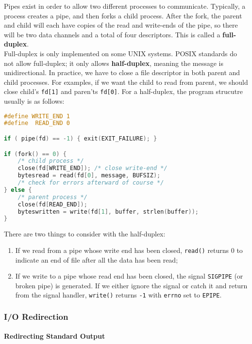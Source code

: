 \documentclass{article}
\newcommand{\bold}[1]{\textbf{#1}}
\newcommand{\code}[1]{\texttt{#1}}
\begin{document}
Pipes exist in order to allow two different processes to communicate. Typically, a process creates a pipe, and then forks a child process. After the fork, the parent and child will each have copies of the read and write-ends of the pipe, so there will be two data channels and a total of four descriptors. This is called a \bold{full-duplex}. \\ 

Full-duplex is only implemented on some UNIX systems. POSIX standards do not allow full-duplex; it only allows \bold{half-duplex}, meaning the message is unidirectional. In practice, we have to close a file descriptor in both parent and child processes. For examples, if we want the child to read from parent, we should close child's \code{fd[1]} and paren'ts \code{fd[0]}. For a half-duplex, the program strucutre usually is as follows:

\begin{lstlisting}[language=C]
#define WRITE_END 1
#define  READ_END 0

if ( pipe(fd) == -1) { exit(EXIT_FAILURE); }

if (fork() == 0) {
    /* child process */ 
    close(fd[WRITE_END]); /* close write-end */
    bytesread = read(fd[0], message, BUFSIZ);
    /* check for errors afterward of course */ 
} else {
    /* parent process */
    close(fd[READ_END]);
    byteswritten = write(fd[1], buffer, strlen(buffer));
}
\end{lstlisting}

There are two things to consider with the half-duplex:

\begin{enumerate}
    \item If we read from a pipe whose write end has been closed, \code{read()} returns 0 to indicate an end of file after all the data has been read;
    \item If we write to a pipe whose read end has been closed, the signal \code{SIGPIPE} (or broken pipe) is generated. If we either ignore the signal or catch it and return from the signal handler, \code{write()} returns \code{-1} with \code{errno} set to \code{EPIPE}. 
\end{enumerate}

\subsubsection{I/O Redirection}

\paragraph{Redirecting Standard Output}
\end{document}
